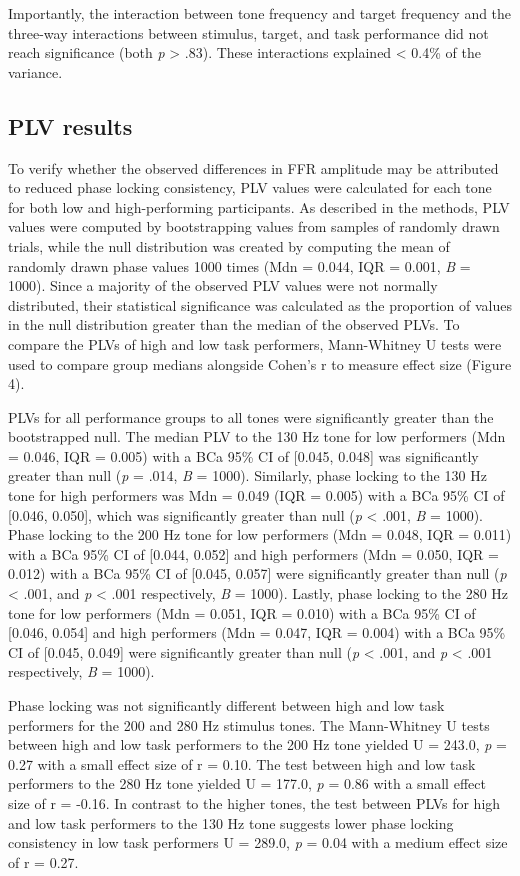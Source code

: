 Importantly, the interaction between tone frequency and target frequency and the three-way interactions between stimulus, target, and task performance did not reach significance (both \textit{p} > .83). These interactions explained < 0.4\% of the variance. 


\subsection*{PLV results}
To verify whether the observed differences in FFR amplitude may be attributed to reduced phase locking consistency, PLV values were calculated for each tone for both low and high-performing participants. As described in the methods, PLV values were computed by bootstrapping values from samples of randomly drawn trials, while the null distribution was created by computing the mean of randomly drawn phase values 1000 times (Mdn = 0.044, IQR = 0.001, \textit{B} = 1000). Since a majority of the observed PLV values were not normally distributed, their statistical significance was calculated as the proportion of values in the null distribution greater than the median of the observed PLVs. To compare the PLVs of high and low task performers, Mann-Whitney U tests were used to compare group medians alongside Cohen’s r to measure effect size (Figure 4).

PLVs for all performance groups to all tones were significantly greater than the bootstrapped null. The median PLV to the 130 Hz tone for low performers (Mdn = 0.046, IQR = 0.005) with a BCa 95\% CI of [0.045, 0.048] was significantly greater than null (\textit{p} = .014, \textit{B} = 1000). Similarly, phase locking to the 130 Hz tone for high performers was Mdn = 0.049 (IQR = 0.005) with a BCa 95\% CI of [0.046, 0.050], which was significantly greater than null (\textit{p} < .001, \textit{B} = 1000). Phase locking to the 200 Hz tone for low performers (Mdn = 0.048, IQR = 0.011) with a BCa 95\% CI of [0.044, 0.052] and high performers (Mdn = 0.050, IQR = 0.012) with a BCa 95\% CI of [0.045, 0.057] were significantly greater than null (\textit{p} < .001, and \textit{p} <  .001 respectively, \textit{B} = 1000). Lastly, phase locking to the 280 Hz tone for low performers (Mdn = 0.051, IQR = 0.010) with a BCa 95\% CI of [0.046, 0.054] and high performers (Mdn = 0.047, IQR = 0.004) with a BCa 95\% CI of [0.045, 0.049] were significantly greater than null (\textit{p} < .001, and \textit{p} < .001 respectively, \textit{B} = 1000).

Phase locking was not significantly different between high and low task performers for the 200 and 280 Hz stimulus tones. The Mann-Whitney U tests between high and low task performers to the 200 Hz tone yielded U = 243.0, \textit{p} = 0.27 with a small effect size of r = 0.10. The test between high and low task performers to the 280 Hz tone yielded U = 177.0, \textit{p} = 0.86 with a small effect size of r = -0.16. In contrast to the higher tones, the test between PLVs for high and low task performers to the 130 Hz tone suggests lower phase locking consistency in low task performers U = 289.0, \textit{p} = 0.04 with a medium effect size of r = 0.27.

